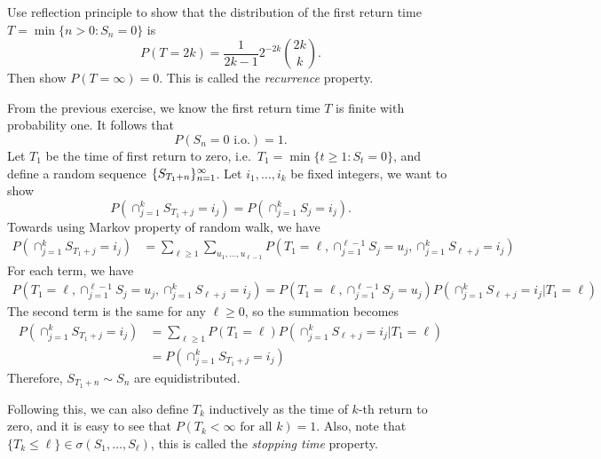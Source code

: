 \documentclass[a4paper]{article}
\begin{document}
\begin{ex}
  Use reflection principle to show that the distribution 
  of the first return time $T = \min \{ n > 0: S_n = 0 \}$ is
  \[
  P(T = 2k) = \frac{1}{2 k - 1} 2^{-2 k} \binom{2k}{k}.
  \]
  Then show $P (T = \infty) = 0$. This is called the \emph{recurrence} 
  property.
\end{ex}

\begin{eg}[recurrence]
  From the previous exercise, we know the first return time $T$ 
  is finite with probability one. It follows that
  \[
  P \left( S_n = 0 \text{ i.o.} \right) = 1.
  \]
  Let $T_1$ be the time of first return to zero, i.e.\ 
  $T_1 = \min \{ t \geq 1 : S_t = 0 \}$, and define 
  a random sequence $\{ S_{T_1 + n} \}_{n=1}^\infty$. 
  Let $i_1, \dots, i_k$ be fixed integers, we want to show 
  \[
  P \left( \cap_{j=1}^k S_{T_1 + j} = i_j \right)
  = P \left( \cap_{j=1}^k S_j = i_j \right).
  \]
  Towards using Markov property of random walk, we have
  \begin{align*}
    P \left( \cap_{j=1}^k S_{T_1 + j} = i_j \right)
    &= \sum_{\ell \geq 1}  \sum_{u_1, \dots, u_{\ell - 1}}
    P \left( T_1 = \ell, \cap_{j=1}^{\ell - 1} S_j = u_j, 
      \cap_{j=1}^k S_{\ell+ j} = i_j \right)
  \end{align*}
  For each term, we have 
  \begin{align*}
    P \left( T_1 = \ell, \cap_{j=1}^{\ell - 1} S_j = u_j, 
    \cap_{j=1}^k S_{\ell + j} = i_j \right)
    = P \left( T_1 = \ell, \cap_{j=1}^{\ell - 1} S_j = u_j \right)
    P \left( \cap_{j=1}^k S_{\ell + j} = i_j | T_1 = \ell \right)
  \end{align*}
  The second term is the same for any $\ell \geq 0$, so the summation 
  becomes 
  \begin{align*}
    P(\cap_{j=1}^k S_{T_1 + j} = i_j)
    &= \sum_{\ell \geq 1} P(T_1 = \ell) 
    P \left( \cap_{j=1}^k S_{\ell + j} = i_j | T_1 = \ell \right) \\
    &= P(\cap_{j=1}^k S_{T_1 + j} = i_j)
  \end{align*}
  Therefore, $S_{T_1 + n} \sim S_n$ are equidistributed.
  
  Following this, we can also define $T_k$ inductively 
  as the time of $k$-th return to zero, and it is easy to 
  see that $P (T_k < \infty \text{ for all $k$}) = 1$. Also, note that 
  $\{ T_k \leq \ell \} \in \sigma (S_1, \dots, S_\ell)$, this is 
  called the \emph{stopping time} property.
\end{eg}
\end{document}
